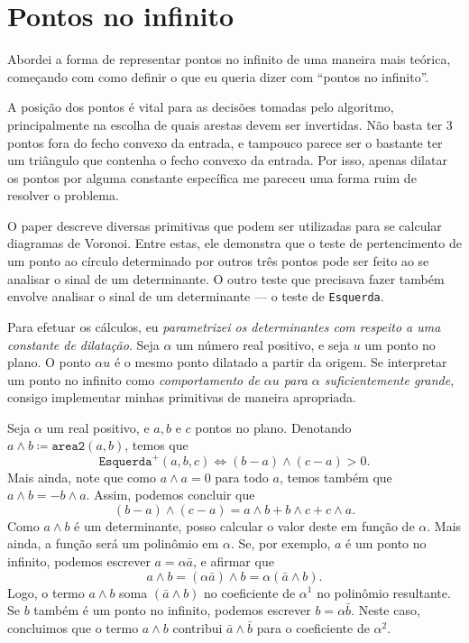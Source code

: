 \documentclass[10pt,reqno,a4paper]{article}
\begin{document}
\section{Pontos no infinito}

Abordei a forma de representar pontos no infinito de uma maneira mais
teórica, começando com como definir o que eu queria dizer com ``pontos
no infinito''.

A posição dos pontos é vital para as decisões tomadas pelo algoritmo,
principalmente na escolha de quais arestas devem ser invertidas. Não basta
ter 3 pontos fora do fecho convexo da entrada, e tampouco parece ser o
bastante ter um triângulo que contenha o fecho convexo da entrada.
Por isso, apenas dilatar os pontos por alguma constante específica me
pareceu uma forma ruim de resolver o problema.

O paper \cite{guibas1985} descreve diversas primitivas que podem ser utilizadas
para se calcular diagramas de Voronoi. Entre estas, ele demonstra que o teste
de pertencimento de um ponto ao círculo determinado por outros três pontos pode
ser feito ao se analisar o sinal de um determinante. O outro teste que precisava
fazer também envolve analisar o sinal de um determinante --- o teste de
\texttt{Esquerda}.

Para efetuar os cálculos, eu \emph{parametrizei os determinantes com respeito
a uma constante de dilatação}.  Seja $\alpha$ um número real positivo, e seja
$u$ um ponto no plano. O ponto $\alpha u$ é o mesmo ponto dilatado a partir da
origem.  Se interpretar um ponto no infinito como \emph{comportamento de $\alpha u$
para $\alpha$ suficientemente grande}, consigo implementar minhas primitivas
de maneira apropriada.

Seja $\alpha$ um real positivo, e $a, b$ e $c$ pontos no plano. Denotando
$a \wedge b \coloneqq \texttt{area2}(a, b)$, temos que
\[\texttt{Esquerda}^+(a,b,c) \iff (b - a) \wedge (c - a) > 0.\]
Mais ainda, note que como $a \wedge a = 0$ para todo $a$, temos também
que $a \wedge b = - b \wedge a$. Assim, podemos concluir que
\[(b - a) \wedge (c - a) = a \wedge b + b \wedge c + c \wedge a.\]
Como $a \wedge b$ é um determinante, posso calcular o valor deste em função
de $\alpha$. Mais ainda, a função será um polinômio em $\alpha$.
Se, por exemplo, $a$ é um ponto no infinito, podemos escrever $a = \alpha \bar{a}$,
e afirmar que
\[a \wedge b = (\alpha \bar{a}) \wedge b = \alpha (\bar{a} \wedge b).\]
Logo, o termo $a \wedge b$ soma $(\bar{a} \wedge b)$ no coeficiente de $\alpha^1$
no polinômio resultante. Se $b$ também é um ponto no infinito, podemos escrever
$b = \alpha \bar{b}$. Neste caso, concluimos que o termo $a \wedge b$ contribui
$\bar{a} \wedge \bar{b}$ para o coeficiente de $\alpha^2$.
\end{document}
